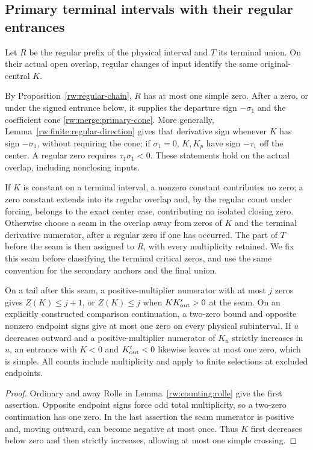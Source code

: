 \subsection{Primary terminal intervals with their regular entrances}
\label{rw:anchors:primary}

Let $R$ be the regular prefix of the physical interval and $T$ its
terminal union. On their actual open overlap, regular changes of input
identify the same original-central $K$.

By Proposition~\ref{rw:regular-chain}, $R$ has at most one simple
zero. After a zero, or under the signed entrance below, it supplies
the departure sign $-\sigma_1$ and the coefficient cone
\eqref{rw:merge:primary-cone}. More generally,
Lemma~\ref{rw:finite:regular-direction} gives that derivative sign
whenever $K$ has sign $-\sigma_1$, without requiring the cone;
if $\sigma_1=0$, $K,K_p$ have sign $-\tau_1$ off the center.
A regular zero requires $\tau_1\sigma_1<0$.
These statements hold on the actual overlap, including nonclosing inputs.

\label{rw:anchors:seam-convention}
If $K$ is constant on a terminal interval, a nonzero constant
contributes no zero; a zero constant extends into its regular overlap
and, by the regular count under forcing, belongs to the exact center
case, contributing no isolated closing zero. Otherwise choose a seam
in the overlap away from zeros of $K$ and the terminal derivative
numerator, after a regular zero if one has occurred. The part of $T$ before the seam is then assigned to $R$,
with every multiplicity retained. We fix this seam before classifying
the terminal critical zeros, and use the same convention for the
secondary anchors and the final union.

\begin{lemma}\label{rw:anchors:calculus}
On a tail after this seam, a positive-multiplier numerator with at
most $j$ zeros gives $Z(K)\le j+1$, or $Z(K)\le j$ when
$K K'_{\rm out}>0$ at the seam. On an explicitly constructed
comparison continuation, a two-zero bound and opposite nonzero
endpoint signs give at most one zero on every physical subinterval.
If $u$ decreases outward and a positive-multiplier numerator of
$K_u$ strictly increases in $u$, an entrance with $K<0$ and
$K'_{\rm out}<0$ likewise leaves at most one zero, which is simple.
All counts include multiplicity and apply to finite selections at
excluded endpoints.
\end{lemma}
\begin{proof}
Ordinary and away Rolle in Lemma~\ref{rw:counting:rolle} give the
first assertion. Opposite endpoint signs force odd total multiplicity,
so a two-zero continuation has one zero. In the last assertion the
seam numerator is positive and, moving outward, can become negative
at most once. Thus $K$ first decreases below zero and then strictly
increases, allowing at most one simple crossing.
\end{proof}

